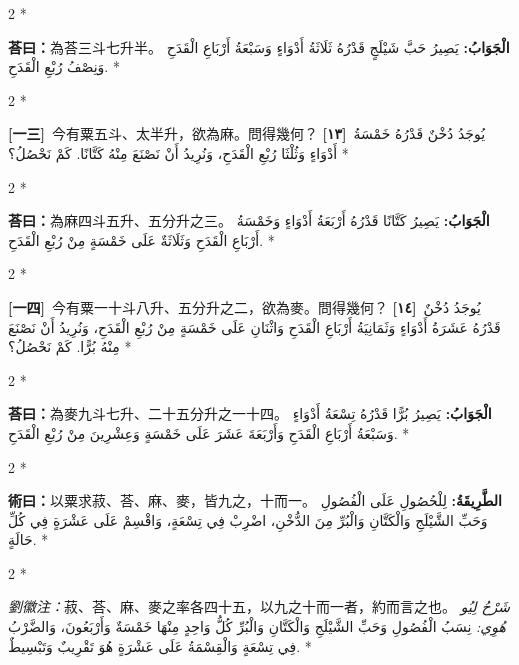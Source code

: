 \documentclass[11pt,a4paper]{article}
\newcommand{\ar}[1]{\arabicfont\beginR #1\endR}
\newcommand{\problemnum}[1]{\textbf{[\ignorespaces#1\unskip]}}
\newenvironment{bilingual}{%
  \begin{paracol}{2}%
  \switchcolumn[0]*%
}{%
  \end{paracol}%
}
\newcommand{\cnline}[1]{\switchcolumn[0]\noindent #1 \switchcolumn[1]}
\newcommand{\arline}[1]{\noindent\ar{#1} \switchcolumn[0]*}
\newenvironment{prob bilingual}{%
  \begin{paracol}{2}%
  \switchcolumn[0]*%
}{%
  \end{paracol}%
  \vspace{0.3em}%
}
\begin{document}
\begin{bilingual}
\cnline{\textcolor{answercolor}{\textbf{荅曰：}}為荅三斗七升半。}
\arline{\textcolor{answercolor}{\textbf{الْجَوَابُ:}} يَصِيرُ حَبَّ شَيْلَجٍ قَدْرُهُ ثَلَاثَةُ أَدْوَاءٍ وَسَبْعَةُ أَرْبَاعِ الْقَدَحِ وَنِصْفُ رُبْعِ الْقَدَحِ.}
\end{bilingual}

\begin{bilingual}
\cnline{\problemnum{一三}\, 今有粟五斗、太半升，欲為麻。問得幾何？}
\arline{\problemnum{١٣}\, يُوجَدُ دُخْنٌ قَدْرُهُ خَمْسَةُ أَدْوَاءٍ وَثُلْثَا رُبْعِ الْقَدَحِ، وَنُرِيدُ أَنْ نَصْنَعَ مِنْهُ كَتَّانًا. كَمْ نَحْصُلُ؟}
\end{bilingual}

\begin{bilingual}
\cnline{\textcolor{answercolor}{\textbf{荅曰：}}為麻四斗五升、五分升之三。}
\arline{\textcolor{answercolor}{\textbf{الْجَوَابُ:}} يَصِيرُ كَتَّانًا قَدْرُهُ أَرْبَعَةُ أَدْوَاءٍ وَخَمْسَةُ أَرْبَاعِ الْقَدَحِ وَثَلَاثَةٌ عَلَى خَمْسَةٍ مِنْ رُبْعِ الْقَدَحِ.}
\end{bilingual}

\begin{bilingual}
\cnline{\problemnum{一四}\, 今有粟一十斗八升、五分升之二，欲為麥。問得幾何？}
\arline{\problemnum{١٤}\, يُوجَدُ دُخْنٌ قَدْرُهُ عَشَرَةُ أَدْوَاءٍ وَثَمَانِيَةُ أَرْبَاعِ الْقَدَحِ وَاثْنَانِ عَلَى خَمْسَةٍ مِنْ رُبْعِ الْقَدَحِ، وَنُرِيدُ أَنْ نَصْنَعَ مِنْهُ بُرًّا. كَمْ نَحْصُلُ؟}
\end{bilingual}

\begin{bilingual}
\cnline{\textcolor{answercolor}{\textbf{荅曰：}}為麥九斗七升、二十五分升之一十四。}
\arline{\textcolor{answercolor}{\textbf{الْجَوَابُ:}} يَصِيرُ بُرًّا قَدْرُهُ تِسْعَةُ أَدْوَاءٍ وَسَبْعَةُ أَرْبَاعِ الْقَدَحِ وَأَرْبَعَةَ عَشَرَ عَلَى خَمْسَةٍ وَعِشْرِينَ مِنْ رُبْعِ الْقَدَحِ.}
\end{bilingual}

\begin{bilingual}
\cnline{%
\textcolor{methodcolor}{\textbf{術曰：}}以粟求菽、荅、麻、麥，皆九之，十而一。
}
\arline{%
\textcolor{methodcolor}{\textbf{الطَّرِيقَةُ:}} لِلْحُصُولِ عَلَى الْفُصُولِ وَحَبِّ الشَّيْلَجِ وَالْكَتَّانِ وَالْبُرِّ مِنَ الدُّخْنِ، اضْرِبْ فِي تِسْعَةٍ، وَاقْسِمْ عَلَى عَشْرَةٍ فِي كُلِّ حَالَةٍ.
}
\end{bilingual}

\begin{bilingual}
\cnline{%
\textcolor{commentarycolor}{\small\textit{劉徽注：}}菽、荅、麻、麥之率各四十五，以九之十而一者，約而言之也。
}
\arline{%
\textcolor{commentarycolor}{\small\textit{شَرْحُ لِيُو هُوِي:}} نِسَبُ الْفُصُولِ وَحَبِّ الشَّيْلَجِ وَالْكَتَّانِ وَالْبُرِّ كُلُّ وَاحِدٍ مِنْهَا خَمْسَةٌ وَأَرْبَعُونَ، وَالضَّرْبُ فِي تِسْعَةٍ وَالْقِسْمَةُ عَلَى عَشْرَةٍ هُوَ تَقْرِيبٌ وَتَبْسِيطٌ.
}
\end{bilingual}
\end{document}

